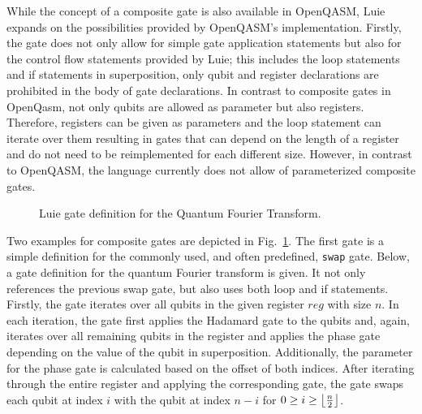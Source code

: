 While the concept of a composite gate is also available in OpenQASM, Luie expands on the possibilities provided by OpenQASM's implementation. Firstly, the gate does not only allow for simple gate application statements but also for the control flow statements provided by Luie; this includes the loop statements and if statements in superposition, only qubit and register declarations are prohibited in the body of gate declarations. In contrast to composite gates in OpenQasm, not only qubits are allowed as parameter but also registers. Therefore, registers can be given as parameters and the loop statement can iterate over them resulting in gates that can depend on the length of a register and do not need to be reimplemented for each different size. However, in contrast to OpenQASM, the language currently does not allow of parameterized composite gates.   

\begin{figure}[htp]
    \centering     
    
    \caption{Luie gate definition for the Quantum Fourier Transform.}
    \label{fig:qft_example}
\end{figure}

Two examples for composite gates are depicted in Fig.~\ref{fig:qft_example}. The first gate is a simple definition for the commonly used, and often predefined, \texttt{swap} gate. Below, a gate definition for the quantum Fourier transform is given. It not only references the previous swap gate, but also uses both loop and if statements. Firstly, the gate iterates over all qubits in the given register $reg$ with size $n$. In each iteration, the gate first applies the Hadamard gate to the qubits and, again, iterates over all remaining qubits in the register and applies the phase gate depending on the value of the qubit in superposition. Additionally, the parameter for the phase gate is calculated based on the offset of both indices. After iterating through the entire register and applying the corresponding gate, the gate swaps each qubit at index $i$ with the qubit at index $n - i$ for $0 \geq i \geq \floor*{\frac{n}{2}}$. 